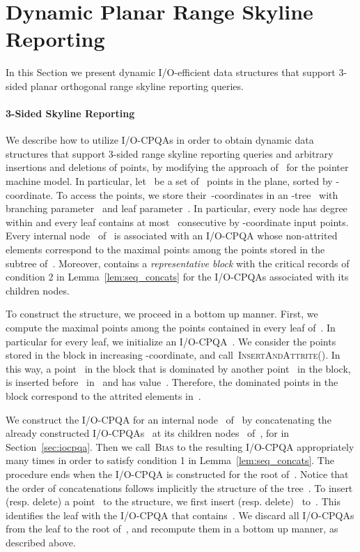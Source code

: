 \documentclass[]{article}
\begin{document}
\section{Dynamic Planar Range Skyline Reporting} \label{sec:skyline}


In this Section we present dynamic I/O-efficient data structures that support
3-sided planar orthogonal range skyline reporting queries.

\paragraph{3-Sided Skyline Reporting}

We describe how to utilize I/O-CPQAs in order to obtain dynamic data structures
that support 3-sided range skyline reporting queries and arbitrary insertions
and deletions of points, by modifying the approach of~\cite{OL81} for the
pointer machine model. In particular, let~ be a set of~ points in the
plane, sorted by -coordinate. To access the points, we store
their~-coordinates in an -tree~ with branching parameter~
and leaf parameter~. In particular, every node has degree within
 and every leaf contains at most~ consecutive by -coordinate input
points. Every internal node~ of~ is associated with an I/O-CPQA whose
non-attrited elements correspond to the maximal points among the points stored
in the subtree of~. Moreover,  contains a \textit{representative block}
with the critical records of condition 2 in Lemma~\ref{lem:seq_concats} for the
I/O-CPQAs associated with its children nodes.

To construct the structure, we proceed in a bottom up manner. First, we compute
the maximal points among the points contained in every leaf of~. In
particular for every leaf, we initialize an I/O-CPQA~. We consider the
points~ stored in the block in increasing -coordinate, and
call~\textsc{InsertAndAttrite}(). In this way, a point~ in the block
that is dominated by another point~ in the block, is inserted before~
in~ and has value~. Therefore, the
dominated points in the block correspond to the attrited elements in~.

We construct the I/O-CPQA for an internal node~ of~ by concatenating the
already constructed I/O-CPQAs~ at its children nodes~ of~, for  in Section~\ref{sec:iocpqa}. Then we call~\textsc{Bias} to
the resulting I/O-CPQA appropriately many times in order to satisfy condition 1
in Lemma~\ref{lem:seq_concats}. The procedure ends when the I/O-CPQA is
constructed for the root of~. Notice that the order of concatenations
follows implicitly the structure of the tree~. To insert (resp. delete) a
point~ to the structure, we first insert (resp.
delete)~ to~. This identifies the leaf with the I/O-CPQA that
contains~. We discard all I/O-CPQAs from the leaf to the root of~, and
recompute them in a bottom up manner, as described above.
\end{document}
